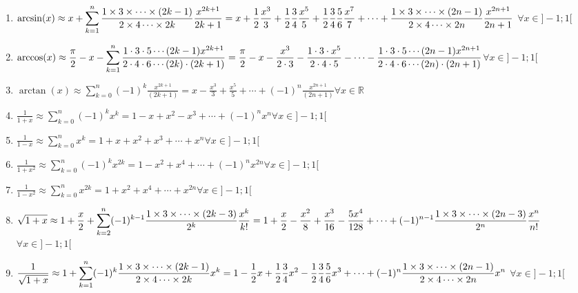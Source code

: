 \documentclass[11pt,a4paper]{article}
\begin{document}
\begin{enumerate}
\item $\displaystyle\arcsin(x) \approx x + \sum_{k=1}^{n} \frac{1\times 3\times\cdots\times (2k-1)}{2\times 4\cdots\times 2k}\frac{x^{2k+1}}{2k+1} =\\ x + \frac{1}{2} \frac{x^3}{3} + \frac{1}{2}\frac{3}{4}\frac{x^5}{5} + \frac{1}{2} \frac{3}{4} \frac{5}{6}\frac{x^7}{7} + \cdots + \frac{1\times 3\times\cdots\times (2n-1)}{2\times 4\cdots\times 2n}\frac{x^{2n+1}}{2n+1}$ \hfill$\forall x \in ]-1;1[$ 
\item $\displaystyle\arccos(x) \approx \frac{\pi}{2} - x - \sum_{k=1}^{n} \frac{1 \cdot 3 \cdot 5 \cdots (2k-1) x^{2k+1}}{2 \cdot 4 \cdot 6 \cdots (2k) \cdot (2k+1)} = \\ \frac{\pi}{2} - x - \frac{x^3}{2 \cdot 3} - \frac{1 \cdot 3 \cdot x^5}{2 \cdot 4 \cdot 5} - \cdots - \frac{1 \cdot 3 \cdot 5 \cdots (2n-1) x^{2n+1}}{2 \cdot 4 \cdot 6 \cdots (2n) \cdot (2n+1)} $\hfill$\forall x \in ]-1;1[$
\item $\displaystyle\arctan(x) \approx \sum_{k=0}^{n} (-1)^k \frac{x^{2k+1}}{(2k+1)} = x - \frac{x^3}{3} + \frac{x^5}{5} + \cdots + (-1)^n \frac{x^{2n+1}}{(2n+1)}$\hfill$\forall x \in \mathbb{R}$
\item $\displaystyle \frac{1}{1+x} \approx \sum_{k=0}^{n} (-1)^k x^k = 1 - x + x^2 - x^3 + \cdots + (-1)^n x^n$\hfill$\forall x \in ]-1;1[$  
\item $\displaystyle \frac{1}{1-x} \approx \sum_{k=0}^{n} x^k = 1 + x + x^2 + x^3 + \cdots + x^n$\hfill$\forall x \in ]-1;1[$
\item $\displaystyle \frac{1}{1+x^2} \approx \sum_{k=0}^{n} (-1)^k x^{2k} = 1 - x^2 + x^4 + \cdots + (-1)^n x^{2n}$\hfill$\forall x \in ]-1;1[$  
\item $\displaystyle \frac{1}{1-x^2} \approx \sum_{k=0}^{n} x^{2k} = 1 + x^2 + x^4 + \cdots + x^{2n}$\hfill$\forall x \in ]-1;1[$
\item $\displaystyle \sqrt{1+x} \approx 1 + \frac{x}{2} + \sum_{k=2}^{n} (-1)^{k-1} \frac{1\times3\times\cdots\times(2k-3)}{2^k} \frac{x^k}{k!} =\\ 1 + \frac{x}{2} - \frac{x^2}{8} + \frac{x^3}{16} - \frac{5x^4}{128} + \cdots + (-1)^{n-1} \frac{1\times3\times\cdots\times(2n-3)}{2^n} \frac{x^n}{n!} $\hfill$\forall x \in ]-1;1[$
\item $\displaystyle \frac{1}{\sqrt{1+x}} \approx 1 + \sum_{k=1}^{n} (-1)^k \frac{1\times 3\times\cdots\times (2k-1)}{2\times 4\cdots\times 2k} x^k =\\ 1 - \frac{1}{2} x + \frac{1}{2}\frac{3}{4} x^2 - \frac{1}{2}\frac{3}{4}\frac{5}{6} x^3 + \cdots + (-1)^n \frac{1\times 3\times\cdots\times (2n-1)}{2\times 4\cdots\times 2n} x^n$ \hfill$\forall x \in ]-1;1[$

\end{enumerate}
\end{document}
